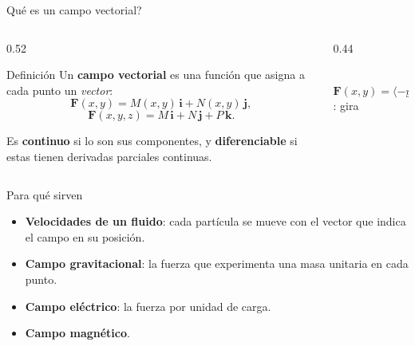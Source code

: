 \documentclass[11pt,aspectratio=169]{beamer}
\begin{document}
\begin{frame}{\textquestiondown{}Qué es un campo vectorial?}
  \begin{columns}
    \begin{column}{0.52\textwidth}
      \begin{block}{Definición}
        Un \textbf{campo vectorial} es una función que asigna a cada punto un \emph{vector}:
        \[
          \mathbf F(x,y)=M(x,y)\,\mathbf i + N(x,y)\,\mathbf j,
        \]
        \[
          \mathbf F(x,y,z)=M\,\mathbf i + N\,\mathbf j + P\,\mathbf k.
        \]
      \end{block}
      \pause
      \vspace{4pt}
      {\small Es \textbf{continuo} si lo son sus componentes, y \textbf{diferenciable} si estas tienen derivadas parciales continuas.}
    \end{column}
    \begin{column}{0.44\textwidth}
      \centering
      \\[2pt]
      {\footnotesize\color{gray60} $\mathbf F(x,y)=\langle -y,\ x\rangle$: gira}
    \end{column}
  \end{columns}
\end{frame}

\begin{frame}{Para qué sirven}
  \begin{itemize}
    \setlength{\itemsep}{6pt}
    \item \textbf{Velocidades de un fluido}: cada partícula se mueve con el vector que indica el campo en su posición.
    \pause
    \item \textbf{Campo gravitacional}: la fuerza que experimenta una masa unitaria en cada punto.
    \pause
    \item \textbf{Campo eléctrico}: la fuerza por unidad de carga.
    \pause
    \item \textbf{Campo magnético}.
  \end{itemize}
  \vspace{10pt}
  \pause
\end{frame}
\end{document}
